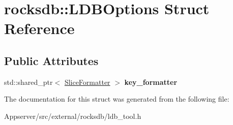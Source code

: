 \hypertarget{structrocksdb_1_1LDBOptions}{}\section{rocksdb\+:\+:L\+D\+B\+Options Struct Reference}
\label{structrocksdb_1_1LDBOptions}
\subsection*{Public Attributes}
\begin{DoxyCompactItemize}
\item 
std\+::shared\+\_\+ptr$<$ \hyperlink{classrocksdb_1_1SliceFormatter}{Slice\+Formatter} $>$ {\bfseries key\+\_\+formatter}\hypertarget{structrocksdb_1_1LDBOptions_afc3f242e28b1f1980c568e5c5374e4f0}{}\label{structrocksdb_1_1LDBOptions_afc3f242e28b1f1980c568e5c5374e4f0}

\end{DoxyCompactItemize}


The documentation for this struct was generated from the following file\+:\begin{DoxyCompactItemize}
\item 
Appserver/src/external/rocksdb/ldb\+\_\+tool.\+h\end{DoxyCompactItemize}
